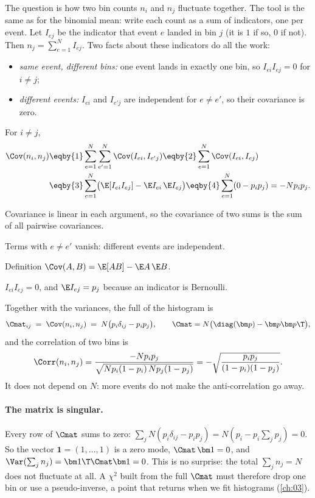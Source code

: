 The question is how two bin counts $n_i$ and $n_j$ fluctuate together. The tool is the same as for the binomial mean: write each count as a sum of indicators, one per event. Let $I_{e j}$ be the indicator that event $e$ landed in bin $j$ (it is $1$ if so, $0$ if not). Then $n_j=\sum_{e=1}^N I_{ej}$. Two facts about these indicators do all the work:
\begin{itemize}[leftmargin=1.4em,itemsep=1pt]
  \item \emph{same event, different bins:} one event lands in exactly one bin, so $I_{ei}I_{ej}=0$ for $i\ne j$;
  \item \emph{different events:} $I_{ei}$ and $I_{e'j}$ are independent for $e\ne e'$, so their covariance is zero.
\end{itemize}
For $i\neq j$,
\begin{align}
  \Cov(n_i,n_j)
  &\eqby{1} \sum_{e=1}^N\sum_{e'=1}^N \Cov(I_{ei},I_{e'j})
   \eqby{2} \sum_{e=1}^N \Cov(I_{ei},I_{ej}) \nonumber\\
  &\eqby{3} \sum_{e=1}^N\bigl(\E[I_{ei}I_{ej}]-\E I_{ei}\,\E I_{ej}\bigr)
   \eqby{4} \sum_{e=1}^N (0-p_ip_j) = -Np_ip_j . \label{2a:eq:multcov}
\end{align}
\begin{explain}
  \item Covariance is linear in each argument, so the covariance of two sums is the sum of all pairwise covariances.
  \item Terms with $e\ne e'$ vanish: different events are independent.
  \item Definition $\Cov(A,B)=\E[AB]-\E A\,\E B$.
  \item $I_{ei}I_{ej}=0$, and $\E I_{ej}=p_j$ because an indicator is Bernoulli.
\end{explain}
Together with the variances, the full  of the histogram is
\begin{equation}
  \Cmat_{ij}\;=\;\Cov(n_i,n_j)\;=\;N\bigl(p_i\delta_{ij}-p_ip_j\bigr),
  \qquad \Cmat=N\bigl(\diag(\bm p)-\bm p\bm p\T\bigr), \label{2a:eq:multC}
\end{equation}
and the correlation of two bins is
\[
  \Corr(n_i,n_j)=\frac{-Np_ip_j}{\sqrt{Np_i(1-p_i)\,Np_j(1-p_j)}}=-\sqrt{\frac{p_ip_j}{(1-p_i)(1-p_j)}} .
\]
It does not depend on $N$: more events do not make the anti-correlation go away.

\paragraph{The matrix is singular.} Every row of $\Cmat$ sums to zero: $\sum_jN(p_i\delta_{ij}-p_ip_j)=N(p_i-p_i\sum_jp_j)=0$. So the vector $\bm 1=(1,\dots,1)$ is a zero mode, $\Cmat\,\bm 1=0$, and $\Var(\sum_jn_j)=\bm1\T\Cmat\bm1=0$. This is no surprise: the total $\sum_jn_j=N$ does not fluctuate at all. A $\chi^2$ built from the full $\Cmat$ must therefore drop one bin or use a pseudo-inverse, a point that returns when we fit histograms (\cref{ch:03}).

